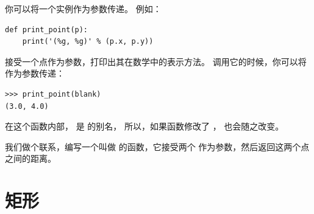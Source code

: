 
你可以将一个实例作为参数传递。 例如：


\begin{lstlisting}
def print_point(p):
    print('(%g, %g)' % (p.x, p.y))
\end{lstlisting}


 接受一个点作为参数，打印出其在数学中的表示方法。
调用它的时候，你可以将  作为参数传递：

\begin{lstlisting}
>>> print_point(blank)
(3.0, 4.0)
\end{lstlisting}


在这个函数内部，  是  的别名，
所以，如果函数修改了  ，  也会随之改变。


我们做个联系，编写一个叫做  的函数，它接受两个  作为参数，然后返回这两个点之间的距离。


\section{矩形}
\label{rectangles}


